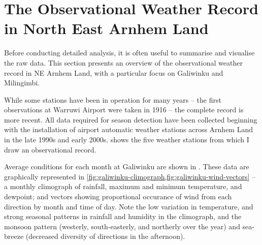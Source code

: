 \section{The Observational Weather Record in North East Arnhem Land}
\label{sec:obs-weather}

Before conducting detailed analysis, it is often useful to summarise and
visualise the raw data.  This section presents an overview of the
observational weather record in NE Arnhem Land, with a particular focus
on Galiwinku and Milingimbi.

While some stations have been in operation for many years -- the first observations
at Warruwi Airport were taken in 1916 -- the complete record is more recent.
All data required for season detection have been collected beginning with
the installation of airport automatic weather stations across Arnhem Land
in the late 1990s and early 2000s.   shows
the five weather stations from which I draw an observational record.

Average conditions for each month at Galiwinku are shown in
.  These data are graphically represented
in \cref{fig:galiwinku-climograph,fig:galiwinku-wind-vectors} -- a monthly
climograph of rainfall, maximum and minimum temperature, and dewpoint; and
vectors showing proportional occurance of wind from each direction by month
and time of day.  Note the low variation in temperature, and strong seasonal
patterns in rainfall and humidity in the climograph, and the monsoon pattern
(westerly, south-easterly, and northerly over the year) and sea-breeze
(decreased diversity of directions in the afternoon).


